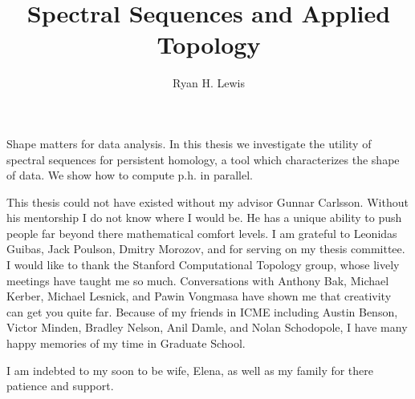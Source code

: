 \documentclass[12pt,twsoside]{report}
\title{Spectral Sequences and Applied Topology}
\author{Ryan H. Lewis}
\begin{document}
\maketitle

%
Shape matters for data analysis. In this thesis we investigate the utility of spectral sequences for persistent homology, a tool which characterizes the shape of data. We show how to compute p.h. in parallel. 


This thesis could not have existed without my advisor Gunnar Carlsson. Without his mentorship I do not know where I would be. He has a unique ability to push people far beyond there mathematical comfort levels. I am grateful to Leonidas Guibas, Jack Poulson, Dmitry Morozov, and  for serving on my thesis committee. I would like to thank the Stanford Computational Topology group, whose lively meetings have taught me so much. Conversations with Anthony Bak, Michael Kerber, Michael Lesnick, and Pawin Vongmasa have shown me that creativity can get you quite far. Because of my friends in ICME including Austin Benson, Victor Minden, Bradley Nelson, Anil Damle, and Nolan Schodopole, I have many happy memories of my time in Graduate School. 

I am indebted to my soon to be wife, Elena, as well as my family for there patience and support.

 \afterpreface
%








%
%
%



%
% 
\end{document}
